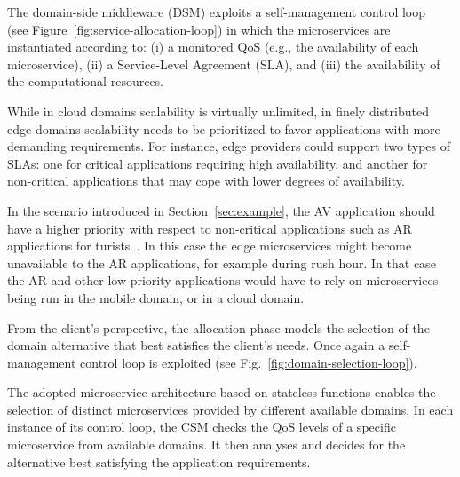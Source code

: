 The domain-side middleware (DSM) exploits a self-management control loop~\cite{kephart2003vision} (see Figure~\ref{fig:service-allocation-loop}) in which the microservices are instantiated according to: (i) a monitored QoS (e.g., the availability of each microservice), (ii) a Service-Level Agreement (SLA), and (iii) the availability of the computational resources. 



While in cloud domains scalability is virtually unlimited, in finely distributed edge domains scalability needs to be prioritized to favor applications with more demanding requirements. For instance, edge providers could support two types of SLAs: one for critical applications requiring high availability, and another for non-critical applications that may cope with lower degrees of availability.  

In the scenario introduced in Section~\ref{sec:example}, the AV application should have a higher priority with respect to non-critical applications such as AR applications for turists~\cite{GarrigaMendonca2017}. In this case the edge microservices might become unavailable to the AR applications, for example during rush hour. In that case the AR and other low-priority applications would have to rely on microservices being run in the mobile domain, or in a cloud domain.


From the client's perspective, the allocation phase models the selection of the domain alternative that best satisfies the client's needs. Once again a self-management control loop is exploited (see Fig.~\ref{fig:domain-selection-loop}). 

The adopted microservice architecture based on stateless functions enables the selection of distinct microservices provided by different available domains. In each instance of its control loop, the CSM checks the QoS levels of a specific microservice from available domains. It then analyses and decides for the alternative best satisfying the application requirements.

